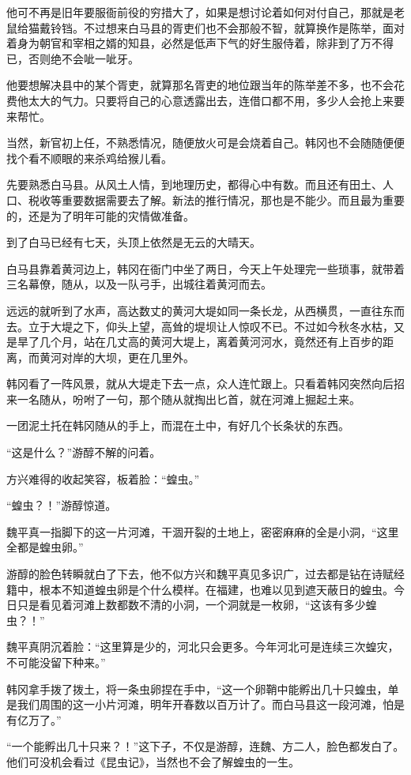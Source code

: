 他可不再是旧年要服衙前役的穷措大了，如果是想讨论着如何对付自己，那就是老鼠给猫戴铃铛。不过想来白马县的胥吏们也不会那般不智，就算换作是陈举，面对着身为朝官和宰相之婿的知县，必然是低声下气的好生服侍着，除非到了万不得已，否则绝不会呲一呲牙。

他要想解决县中的某个胥吏，就算那名胥吏的地位跟当年的陈举差不多，也不会花费他太大的气力。只要将自己的心意透露出去，连借口都不用，多少人会抢上来要来帮忙。

当然，新官初上任，不熟悉情况，随便放火可是会烧着自己。韩冈也不会随随便便找个看不顺眼的来杀鸡给猴儿看。

先要熟悉白马县。从风土人情，到地理历史，都得心中有数。而且还有田土、人口、税收等重要数据需要去了解。新法的推行情况，那也是不能少。而且最为重要的，还是为了明年可能的灾情做准备。

到了白马已经有七天，头顶上依然是无云的大晴天。

白马县靠着黄河边上，韩冈在衙门中坐了两日，今天上午处理完一些琐事，就带着三名幕僚，随从，以及一队弓手，出城往着黄河而去。

远远的就听到了水声，高达数丈的黄河大堤如同一条长龙，从西横贯，一直往东而去。立于大堤之下，仰头上望，高耸的堤坝让人惊叹不已。不过如今秋冬水枯，又是旱了几个月，站在几丈高的黄河大堤上，离着黄河河水，竟然还有上百步的距离，而黄河对岸的大坝，更在几里外。

韩冈看了一阵风景，就从大堤走下去一点，众人连忙跟上。只看着韩冈突然向后招来一名随从，吩咐了一句，那个随从就掏出匕首，就在河滩上掘起土来。

一团泥土托在韩冈随从的手上，而混在土中，有好几个长条状的东西。

“这是什么？”游醇不解的问着。

方兴难得的收起笑容，板着脸：“蝗虫。”

“蝗虫？！”游醇惊道。

魏平真一指脚下的这一片河滩，干涸开裂的土地上，密密麻麻的全是小洞，“这里全都是蝗虫卵。”

游醇的脸色转瞬就白了下去，他不似方兴和魏平真见多识广，过去都是钻在诗赋经籍中，根本不知道蝗虫卵是个什么模样。在福建，也难以见到遮天蔽日的蝗虫。今日只是看见着河滩上数都数不清的小洞，一个洞就是一枚卵，“这该有多少蝗虫？！”

魏平真阴沉着脸：“这里算是少的，河北只会更多。今年河北可是连续三次蝗灾，不可能没留下种来。”

韩冈拿手拨了拨土，将一条虫卵捏在手中，“这一个卵鞘中能孵出几十只蝗虫，单是我们周围的这一小片河滩，明年开春数以百万计了。而白马县这一段河滩，怕是有亿万了。”

“一个能孵出几十只来？！”这下子，不仅是游醇，连魏、方二人，脸色都发白了。他们可没机会看过《昆虫记》，当然也不会了解蝗虫的一生。

